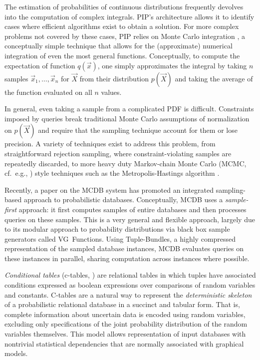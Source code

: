 

The estimation of probabilities of continuous distributions frequently devolves into the computation of complex integrals.  PIP's architecture allows it to identify cases where efficient algorithms exist to obtain a solution.  For more complex problems not covered by these cases, PIP relies on Monte Carlo integration \cite{montecarlo}, a conceptually simple technique that allows for the (approximate) numerical integration of even the most general  functions. Conceptually, to compute the expectation of function $q(\vec x)$, one simply approximates the integral by taking $n$ samples $\vec{x}_1, \dots, \vec{x}_n$ for $\vec{X}$ from their distribution $p(\vec X)$  and  taking  the  average of the function evaluated on all $n$ values.
%

In general, even taking a sample from a complicated PDF is difficult.  Constraints imposed by queries break traditional Monte Carlo assumptions of normalization on $p(\vec X)$ and require that the sampling technique account for them or lose precision.  A variety of techniques exist to address this problem, from straightforward rejection sampling, where constraint-violating samples are repeatedly discarded, to more heavy duty Markov-chain Monte Carlo (MCMC, cf.\ e.g., \cite{GRS1995}) style techniques such as the Metropolis-Hastings algorithm \cite{metropolis,GRS1995}. 

Recently,  a paper on the MCDB system\cite{MCDB} has promoted an integrated sampling-based  approach to  probabilistic databases.  Conceptually,  MCDB uses a {\em sample-first}\/ approach: it   first  computes  samples  of  entire databases and then processes queries  on these samples.  This is a very general and flexible approach, largely due to its modular approach to probability distributions via black box sample generators called VG~Functions.  Using Tuple-Bundles, a highly compressed representation of the sampled database instances, MCDB evaluates queries on these instances in parallel, sharing computation across instances where possible.  

{\em  Conditional tables}\/  (c-tables, \cite{IL1984})  are relational tables in which tuples have associated conditions expressed as boolean expressions over  comparisons of random variables  and constants. C-tables are a natural way to  represent  the  {\em  deterministic skeleton}\/  of a probabilistic relational  database in  a succinct  and tabular  form.  That  is, complete information  about uncertain data is encoded using random  variables, excluding only  specifications  of the  joint  probability  distribution of  the random  variables   themselves.   This  model   allows  representation of  input databases  with  nontrivial statistical  dependencies that are normally associated with graphical models. 

